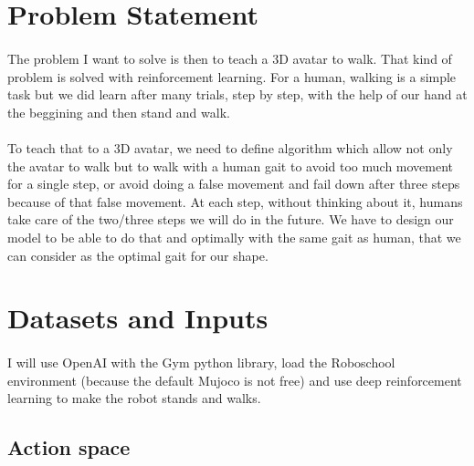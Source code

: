 \documentclass{article}
\begin{document}
	\section{Problem Statement}
  \paragraph{}
  The problem I want to solve is then to teach a 3D avatar to walk. That kind of
  problem is solved with reinforcement learning. For a human, walking is a simple task but we did learn after
  many trials, step by step, with the help of our hand at the beggining and then
  stand and walk.
  \paragraph{}
  To teach that to a 3D avatar, we need to define algorithm
  which allow not only the avatar to walk but to walk with a human gait to avoid
  too much movement for a single step, or avoid doing a false movement and fail
  down after three steps because of that false movement. At each step, without
  thinking about it, humans take care of the two/three steps we will do in the
  future. We have to design our model to be able to do that and optimally with
  the same gait as human, that we can consider as the optimal gait for our shape.
	
	\section{Datasets and Inputs}
  \paragraph{}
  I will use OpenAI with the Gym python library\cite{1606.01540}, load the
  Roboschool environment (because the default Mujoco is not free) and use deep
  reinforcement learning to make the robot stands and walks.
  
  \subsection{Action space}
\end{document}
